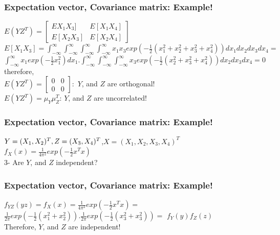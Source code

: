 \documentclass{beamer}
\begin{document}
\begin{frame}
\frametitle{Expectation vector, Covariance matrix: Example!}
 $E(YZ^T) = \begin{bmatrix}
    EX_1X_3]&E[X_1X_4] \\
E[X_2X_3]&E[X_2X_4]
\end{bmatrix}$\newline\\

$E[X_1X_3]=  \int_{-\infty}^{\infty}\int_{-\infty}^{\infty}\int_{-\infty}^{\infty} \int_{-\infty}^{\infty}  x_1x_3exp(-\frac{1}{2}(x_1^2+x_2^2+x_3^2+x_4^2))dx_1dx_2dx_3dx_4=$ \newline\\ $\int_{-\infty}^{\infty}x_1exp(-\frac{1}{2}x_1^2)dx_1.\int_{-\infty}^{\infty}\int_{-\infty}^{\infty} \int_{-\infty}^{\infty}x_3exp(-\frac{1}{2}(x_2^2+x_3^2+x_4^2))dx_2dx_3dx_4 = 0$\newline\\
therefore, \newline\\

$E(YZ^T) = \begin{bmatrix}
    0&0 \\
0&0
\end{bmatrix}
 :$
$Y$, and $Z$ are orthogonal!\newline\\

$E(YZ^T) =\mu_Y\mu_Z^T$: 
$Y$, and $Z$ are uncorrelated!

\end{frame}



\begin{frame}
\frametitle{Expectation vector, Covariance matrix: Example!}
 $Y = (X_1,X_2)^T,\newline Z=(X_3,X_4)^T$,\newline $X= (X_1,X_2,X_3,X_4)^T$\newline\\
$f_X (x) = \frac{1}{4\pi^2}{exp(-\frac{1}{2}x^Tx)}$ \newline\\

3- Are $Y$, and $Z$ independent?
\end{frame}

\begin{frame}
\frametitle{Expectation vector, Covariance matrix: Example!}
$f_{YZ}(yz) = f_X (x) = \frac{1}{4\pi^2}{exp(-\frac{1}{2}x^Tx)} =$\newline\\ $\frac{1}{2\pi}exp(-\frac{1}{2}(x_1^2+x_2^2)).\frac{1}{2\pi}exp(-\frac{1}{2}(x_3^2+x_3^2)) =$ 
$f_Y(y)f_Z(z)$\newline\\
Therefore, $Y$, and $Z$ are independent!
\end{frame}
\end{document}
